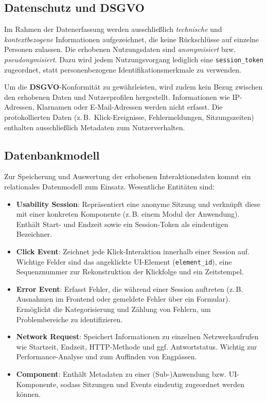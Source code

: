 \documentclass[12pt,oneside]{article}
\begin{document}
\subsection{Datenschutz und DSGVO}
Im Rahmen der Datenerfassung werden ausschließlich \emph{technische} und \emph{kontextbezogene} Informationen aufgezeichnet, die keine Rückschlüsse auf einzelne Personen zulassen. Die erhobenen Nutzungsdaten sind \emph{anonymisiert} bzw. \emph{pseudonymisiert}. Dazu wird jedem Nutzungsvorgang lediglich eine \texttt{session\_token} zugeordnet, statt personenbezogene Identifikationsmerkmale zu verwenden.

Um die \textbf{DSGVO}-Konformität zu gewährleisten, wird zudem kein Bezug zwischen den erhobenen Daten und Nutzerprofilen hergestellt. Informationen wie IP-Adressen, Klarnamen oder E-Mail-Adressen werden nicht erfasst. Die protokollierten Daten (z.\,B.\ Klick-Ereignisse, Fehlermeldungen, Sitzungszeiten) enthalten ausschließlich Metadaten zum Nutzerverhalten. 

\subsection{Datenbankmodell}

Zur Speicherung und Auswertung der erhobenen Interaktionsdaten kommt ein relationales Datenmodell zum Einsatz. Wesentliche Entitäten sind:

\begin{itemize}
    \item \textbf{Usability Session}: Repräsentiert eine anonyme Sitzung und verknüpft diese mit einer konkreten Komponente (z.\,B. einem Modul der Anwendung). Enthält Start- und Endzeit sowie ein Session-Token als eindeutigen Bezeichner.
    \item \textbf{Click Event}: Zeichnet jede Klick-Interaktion innerhalb einer Session auf. Wichtige Felder sind das angeklickte UI-Element (\texttt{element\_id}), eine Sequenznummer zur Rekonstruktion der Klickfolge und ein Zeitstempel.
    \item \textbf{Error Event}: Erfasst Fehler, die während einer Session auftreten (z.\,B. Ausnahmen im Frontend oder gemeldete Fehler über ein Formular). Ermöglicht die Kategorisierung und Zählung von Fehlern, um Problembereiche zu identifizieren.
    \item \textbf{Network Request}: Speichert Informationen zu einzelnen Netzwerkaufrufen wie Startzeit, Endzeit, HTTP-Methode und ggf. Antwortstatus. Wichtig zur Performance-Analyse und zum Auffinden von Engpässen.
    \item \textbf{Component}: Enthält Metadaten zu einer (Sub-)Anwendung bzw. UI-Komponente, sodass Sitzungen und Events eindeutig zugeordnet werden können.
\end{itemize}
\end{document}
